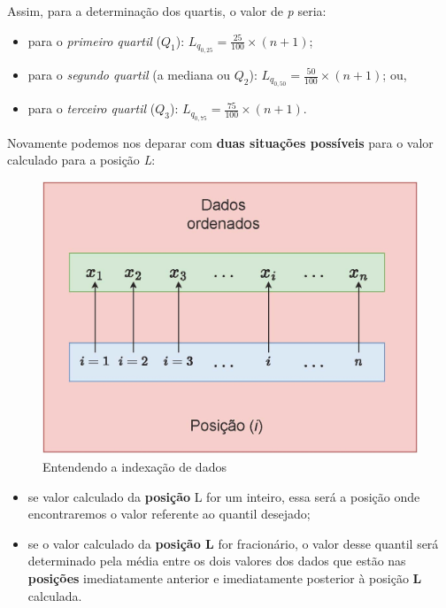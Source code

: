 \documentclass[
]{book}
\providecommand{\tightlist}{%
  \setlength{\itemsep}{0pt}\setlength{\parskip}{0pt}}
\begin{document}
Assim, para a determinação dos quartis, o valor de \emph{p} seria:

\hfill\break

\begin{itemize}
\tightlist
\item
  para o \emph{primeiro quartil} (\(Q_{1}\)): \(L_{q_{0,25}}=\frac{25}{100} \times (n+1)\);
\item
  para o \emph{segundo quartil} (a mediana ou \(Q_{2}\)): \(L_{q_{0,50}}=\frac{50}{100} \times (n+1)\); ou,\\
\item
  para o \emph{terceiro quartil} (\(Q_{3}\)): \(L_{q_{0,75}}=\frac{75}{100} \times (n+1)\).
\end{itemize}

\hfill\break

Novamente podemos nos deparar com \textbf{duas situações possíveis} para o valor calculado para a posição \emph{L}:

\hfill\break

\begin{figure}

{\centering \includegraphics[width=0.6\linewidth]{images3/vetor_posicao} 

}

\caption{Entendendo a indexação de dados}\label{fig:unnamed-chunk-35}
\end{figure}

\hfill\break

\begin{itemize}
\tightlist
\item
  se valor calculado da \textbf{posição} L for um inteiro, essa será a posição onde encontraremos o valor referente ao quantil desejado;\\
\item
  se o valor calculado da \textbf{posição L} for fracionário, o valor desse quantil será determinado pela média entre os dois valores dos dados que estão nas \textbf{posições} imediatamente anterior e imediatamente posterior à posição \textbf{L} calculada.
\end{itemize}
\end{document}
